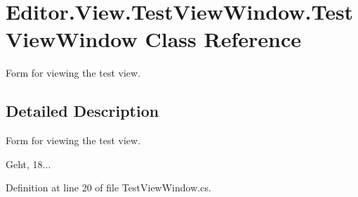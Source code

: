 \section{Editor.\-View.\-Test\-View\-Window.\-Test\-View\-Window Class Reference}
\label{class_editor_1_1_view_1_1_test_view_window_1_1_test_view_window}


Form for viewing the test view.  




\subsection{Detailed Description}
Form for viewing the test view. 

Geht, 18... 

Definition at line 20 of file Test\-View\-Window.\-cs.

